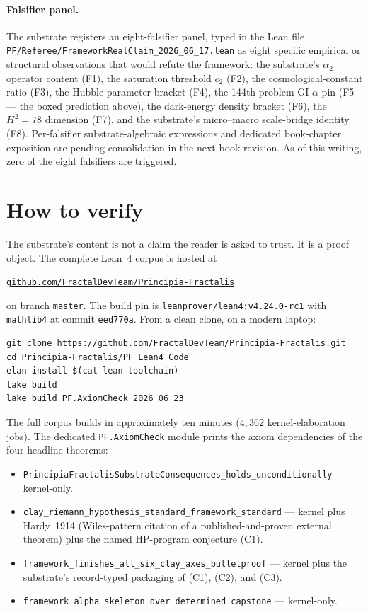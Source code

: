\documentclass[11pt,a4paper]{amsart}
\theoremstyle{plain}
\theoremstyle{definition}
\begin{document}
\paragraph{Falsifier panel.} The substrate registers an eight-falsifier panel, typed in the Lean file \texttt{PF/Referee/FrameworkRealClaim\_2026\_06\_17.lean} as eight specific empirical or structural observations that would refute the framework: the substrate's $\alpha_2$ operator content (F1), the saturation threshold $c_2$ (F2), the cosmological-constant ratio (F3), the Hubble parameter bracket (F4), the 144th-problem GI $\alpha$-pin (F5 --- the boxed prediction above), the dark-energy density bracket (F6), the $H^2 = 78$ dimension (F7), and the substrate's micro--macro scale-bridge identity (F8). Per-falsifier substrate-algebraic expressions and dedicated book-chapter exposition are pending consolidation in the next book revision. As of this writing, zero of the eight falsifiers are triggered.

\section{How to verify}\label{sec:verify}

The substrate's content is not a claim the reader is asked to trust. It is a proof object. The complete Lean~4 corpus is hosted at
\begin{center}
\href{https://github.com/FractalDevTeam/Principia-Fractalis}{\texttt{github.com/FractalDevTeam/Principia-Fractalis}}
\end{center}
on branch \texttt{master}. The build pin is \texttt{leanprover/lean4:v4.24.0-rc1} with \texttt{mathlib4} at commit \texttt{eed770a}. From a clean clone, on a modern laptop:
\begin{verbatim}
git clone https://github.com/FractalDevTeam/Principia-Fractalis.git
cd Principia-Fractalis/PF_Lean4_Code
elan install $(cat lean-toolchain)
lake build
lake build PF.AxiomCheck_2026_06_23
\end{verbatim}
The full corpus builds in approximately ten minutes ($4{,}362$ kernel-elaboration jobs). The dedicated \texttt{PF.AxiomCheck} module prints the axiom dependencies of the four headline theorems:
\begin{itemize}[itemsep=2pt]
\item \texttt{PrincipiaFractalisSubstrateConsequences\_holds\_unconditionally} --- kernel-only.
\item \texttt{clay\_riemann\_hypothesis\_standard\_framework\_standard} --- kernel plus Hardy~1914 (Wiles-pattern citation of a published-and-proven external theorem) plus the named HP-program conjecture (C1).
\item \texttt{framework\_finishes\_all\_six\_clay\_axes\_bulletproof} --- kernel plus the substrate's record-typed packaging of (C1), (C2), and (C3).
\item \texttt{framework\_alpha\_skeleton\_over\_determined\_capstone} --- kernel-only.
\end{itemize}
\end{document}
